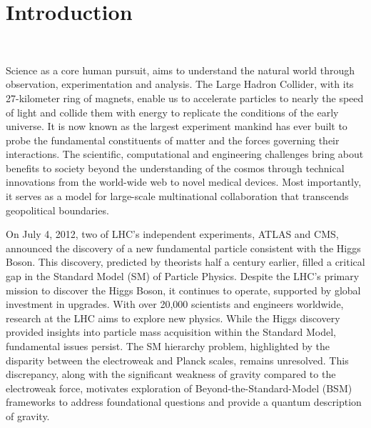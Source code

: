 \chapter{Introduction}~\label{ch:intro}
\raggedright\parindent=25pt
Science as a core human pursuit, aims to understand the natural world through observation, experimentation and analysis. The Large Hadron Collider, with its 27-kilometer ring of magnets, enable us to accelerate particles to nearly the speed of light and collide them with energy to replicate the conditions of the early universe. It is now known as the largest experiment mankind has ever built to probe the fundamental constituents of matter and the forces governing their interactions. The scientific, computational and engineering challenges bring about benefits to society beyond the understanding of the cosmos through technical innovations from the world-wide web to novel medical devices. Most importantly, it serves as a model for large-scale multinational collaboration that transcends geopolitical boundaries.


On July 4, 2012, two of LHC's independent experiments, ATLAS and CMS, announced the discovery of a new fundamental particle consistent with the Higgs Boson. This discovery, predicted by theorists half a century earlier, filled a critical gap in the Standard Model (SM) of Particle Physics. Despite the LHC's primary mission to discover the Higgs Boson, it continues to operate, supported by global investment in upgrades. With over 20,000 scientists and engineers worldwide, research at the LHC aims to explore new physics. While the Higgs discovery provided insights into particle mass acquisition within the Standard Model, fundamental issues persist. The SM hierarchy problem, highlighted by the disparity between the electroweak and Planck scales, remains unresolved. This discrepancy, along with the significant weakness of gravity compared to the electroweak force, motivates exploration of Beyond-the-Standard-Model (BSM) frameworks to address foundational questions and provide a quantum description of gravity.


